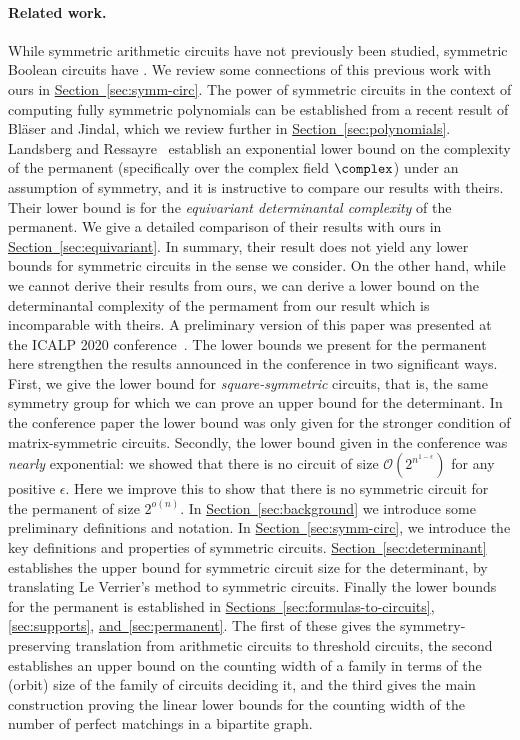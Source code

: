 \documentclass[11pt]{article}
\newcommand{\expref}[2]{\texorpdfstring{\hyperref[#2]{#1~\ref{#2}}}{#1~\ref{#2}}}
\begin{document}
\paragraph*{Related work.}
While symmetric arithmetic circuits have not previously been studied, symmetric
Boolean circuits have \cite{DenenbergGS86,Otto96,AndersonD17,Rossman19}.  
We review some connections of this previous work with ours in 
\expref{Section}{sec:symm-circ}.  The power of symmetric circuits in the
context of computing fully symmetric polynomials can be established from
a recent result of Bl\"{a}ser and Jindal, which we review further in
\expref{Section}{sec:polynomials}.
Landsberg and Ressayre~\cite{LandsbergR16}
establish an exponential lower bound on the complexity of the permanent
(specifically over the complex field $\complex$) under an assumption of
symmetry, and it is instructive to compare our results with theirs. Their lower
bound is for the \emph{equivariant determinantal complexity} of the permanent.  We give a detailed comparison of their results with ours in \expref{Section}{sec:equivariant}.  In summary, their result does not yield any lower bounds for symmetric
circuits in the sense we consider.  On the other hand, while we cannot derive their results from ours, we can derive a lower bound on the determinantal complexity of the permament
%
%
from our result which is incomparable with theirs. 
A preliminary version of this %
paper  %
was presented at the ICALP 2020
%
conference~\cite{conf-version}.
The lower bounds we present for the permanent here strengthen the results announced in the conference in two significant ways.  First, we give the lower bound for \emph{square-symmetric} circuits, that is, the same symmetry group for which we can prove an upper bound for the determinant.  In the conference paper the lower bound was only given for the stronger condition of matrix-symmetric circuits.  Secondly, the lower bound given in the conference was \emph{nearly} exponential: we showed that there is no circuit of size $\mathcal{O}(2^{n^{1-\epsilon}})$ for any positive $\epsilon$.  Here we improve this to show that there is no symmetric circuit for the permanent of size $2^{o(n)}$.
In \expref{Section}{sec:background} we introduce some
preliminary definitions and notation. In \expref{Section}{sec:symm-circ}, we
introduce the key definitions and properties of symmetric circuits.
\expref{Section}{sec:determinant} establishes the upper bound for symmetric circuit
size for the determinant, by translating Le Verrier's method to symmetric
circuits. Finally the lower bounds for the permanent is established in
\expref{Sections}{sec:formulas-to-circuits}, \ref{sec:supports},
\expref{and}{sec:permanent}. The first of these gives the symmetry-preserving
translation from arithmetic circuits to threshold circuits, the second
establishes an %
upper bound  %
on the counting width of a family in terms of the
(orbit) size of the family of circuits deciding it, and the third gives the main
construction proving the linear lower bounds for the counting width of the
number of perfect matchings in a bipartite graph.
\end{document}
